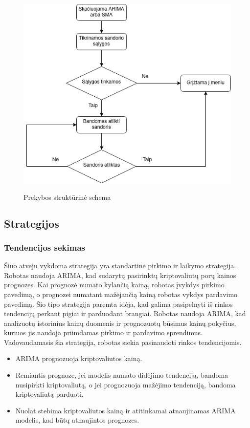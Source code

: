\documentclass{VUMIFInfKursinis}
\begin{document}
\begin{figure}[H]
  \centering
  \includegraphics[width=.5\textwidth]{img/prekyba.png}
  \label{fig:trade_flowchart}
  \caption{Prekybos struktūrinė schema}
\end{figure}


\subsection{Strategijos}
\subsubsection{Tendencijos sekimas}

Šiuo atveju vykdoma strategija yra standartinė pirkimo ir laikymo strategija. Robotas naudoja ARIMA, kad sudarytų pasirinktų kriptovaliutų porų kainos prognozes. 
Kai prognozė numato kylančią kainą, robotas įvykdys pirkimo pavedimą, o prognozei numatant mažėjančią kainą robotas vykdys pardavimo pavedimą. 
Šio tipo strategija paremta idėja, kad galima pasipelnyti iš rinkos tendencijų perkant pigiai ir parduodant brangiai.
Robotas naudoja ARIMA, kad analizuotų istorinius kainų duomenis ir prognozuotų būsimus kainų pokyčius, kuriuos jis naudoja priimdamas pirkimo ir pardavimo sprendimus.
Vadovaudamasis šia strategija, robotas siekia pasinaudoti rinkos tendencijomis. 

\begin {itemize}
\item ARIMA prognozuoja kriptovaliutos kainą.
\item Remiantis prognoze, jei modelis numato didėjimo tendenciją, bandoma nusipirkti kriptovaliutą, o jei prognozuoja mažėjimo tendenciją, bandoma kriptovaliutą parduoti.
\item Nuolat stebima kriptovaliutos kainą ir atitinkamai atnaujinamas ARIMA modelis, kad būtų atnaujintos prognozes.
\end{itemize}
\end{document}
